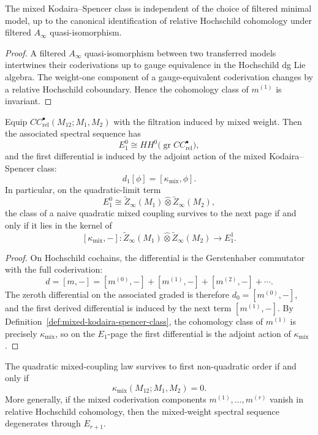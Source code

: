 \begin{lemma}
The mixed Kodaira--Spencer class is independent of the choice of filtered minimal model, up to the canonical identification of relative Hochschild cohomology under filtered $A_\infty$ quasi-isomorphism.
\end{lemma}

\begin{proof}
A filtered $A_\infty$ quasi-isomorphism between two transferred models intertwines their coderivations up to gauge equivalence in the Hochschild dg Lie algebra. The weight-one component of a gauge-equivalent coderivation changes by a relative Hochschild coboundary. Hence the cohomology class of $m^{(1)}$ is invariant.
\end{proof}

\begin{theorem}
Equip $CC^\bullet_{\mathrm{rel}}(M_{12};M_1,M_2)$ with the filtration induced by mixed weight. Then the associated spectral sequence has
\[
E_1^0 \cong HH^0\bigl(\operatorname{gr} CC^\bullet_{\mathrm{rel}}\bigr),
\]
and the first differential is induced by the adjoint action of the mixed Kodaira--Spencer class:
\[
d_1[\phi] = [\kappa_{\mathrm{mix}},\phi].
\]
In particular, on the quadratic-limit term
\[
E_1^0 \cong \widetilde Z_\infty(M_1)\widehat\otimes \widetilde Z_\infty(M_2),
\]
the class of a naive quadratic mixed coupling survives to the next page if and only if it lies in the kernel of
\[
[\kappa_{\mathrm{mix}},-] :
\widetilde Z_\infty(M_1)\widehat\otimes \widetilde Z_\infty(M_2)
\longrightarrow E_1^1.
\]
\end{theorem}

\begin{proof}
On Hochschild cochains, the differential is the Gerstenhaber commutator with the full coderivation:
\[
d = [m,-] = [m^{(0)},-] + [m^{(1)},-] + [m^{(2)},-] + \cdots.
\]
The zeroth differential on the associated graded is therefore $d_0=[m^{(0)},-]$, and the first derived differential is induced by the next term $[m^{(1)},-]$. By Definition~\ref{def:mixed-kodaira-spencer-class}, the cohomology class of $m^{(1)}$ is precisely $\kappa_{\mathrm{mix}}$, so on the $E_1$-page the first differential is the adjoint action of $\kappa_{\mathrm{mix}}$.
\end{proof}

\begin{corollary}
The quadratic mixed-coupling law survives to first non-quadratic order if and only if
\[
\kappa_{\mathrm{mix}}(M_{12};M_1,M_2)=0.
\]
More generally, if the mixed coderivation components $m^{(1)},\dots,m^{(r)}$ vanish in relative Hochschild cohomology, then the mixed-weight spectral sequence degenerates through $E_{r+1}$.
\end{corollary}

